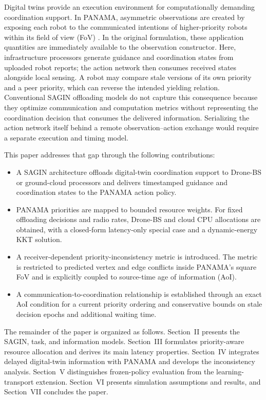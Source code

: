 \IfFileExists{IEEEtran.cls}{\documentclass[conference]{IEEEtran}}{\documentclass[10pt,twocolumn]{article}}
\begin{document}
Digital twins provide an execution environment for computationally demanding coordination support. In PANAMA, asymmetric observations are created by exposing each robot to the communicated intentions of higher-priority robots within its field of view (FoV) \cite{dogru2025panama}. In the original formulation, these application quantities are immediately available to the observation constructor. Here, infrastructure processors generate guidance and coordination states from uploaded robot reports; the action network then consumes received states alongside local sensing. A robot may compare stale versions of its own priority and a peer priority, which can reverse the intended yielding relation. Conventional SAGIN offloading models do not capture this consequence because they optimize communication and computation metrics without representing the coordination decision that consumes the delivered information. Serializing the action network itself behind a remote observation--action exchange would require a separate execution and timing model.

This paper addresses that gap through the following contributions:
\begin{itemize}
    \item A SAGIN architecture offloads digital-twin coordination support to Drone-BS or ground-cloud processors and delivers timestamped guidance and coordination states to the PANAMA action policy.
    \item PANAMA priorities are mapped to bounded resource weights. For fixed offloading decisions and radio rates, Drone-BS and cloud CPU allocations are obtained, with a closed-form latency-only special case and a dynamic-energy KKT solution.
    \item A receiver-dependent priority-inconsistency metric is introduced. The metric is restricted to predicted vertex and edge conflicts inside PANAMA's square FoV and is explicitly coupled to source-time age of information (AoI).
    \item A communication-to-coordination relationship is established through an exact AoI condition for a current priority ordering and conservative bounds on stale decision epochs and additional waiting time.
\end{itemize}

The remainder of the paper is organized as follows. Section~II presents the SAGIN, task, and information models. Section~III formulates priority-aware resource allocation and derives its main latency properties. Section~IV integrates delayed digital-twin information with PANAMA and develops the inconsistency analysis. Section~V distinguishes frozen-policy evaluation from the learning-transport extension. Section~VI presents simulation assumptions and results, and Section~VII concludes the paper.
\end{document}
